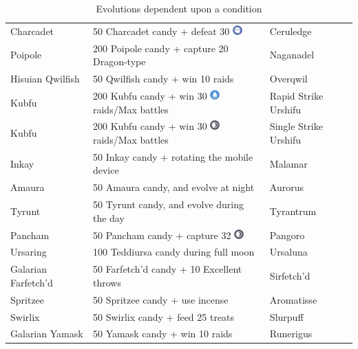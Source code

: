 \begin{table}
\begin{tabular}{lll}
  Charcadet	& 50 Charcadet candy + defeat 30 \includegraphics[width=1em,height=1em]{images/ghost.png}& Ceruledge\\
  Poipole & 200 Poipole candy + capture 20 Dragon-type & Naganadel\\
  Hisuian Qwilfish & 50 Qwilfish candy + win 10 raids & Overqwil\\
  Kubfu	& 200 Kubfu candy + win 30 \includegraphics[width=1em,height=1em]{images/water.png} raids/Max battles & Rapid Strike Urshifu\\
  Kubfu	& 200 Kubfu candy + win 30 \includegraphics[width=1em,height=1em]{images/dark.png} raids/Max battles & Single Strike Urshifu\\
  Inkay	& 50 Inkay candy + rotating the mobile device & Malamar\\
  Amaura & 50 Amaura candy, and evolve at night & Aurorus\\
  Tyrunt & 50 Tyrunt candy, and evolve during the day & Tyrantrum\\
  Pancham	& 50 Pancham candy + capture 32 \includegraphics[width=1em,height=1em]{images/dark.png} & Pangoro\\
  Ursaring & 100 Teddiursa candy during full moon & Ursaluna\\
  Galarian Farfetch'd & 50 Farfetch'd candy + 10 Excellent throws & Sirfetch'd \\
  Spritzee & 50 Spritzee candy + use incense & Aromatisse\\
  Swirlix & 50 Swirlix candy + feed 25 treats & Slurpuff\\
  Galarian Yamask & 50 Yamask candy + win 10 raids & Runerigus\\
\end{tabular}
  \caption{Evolutions dependent upon a condition\label{table:condevolutions}}
\end{table}
